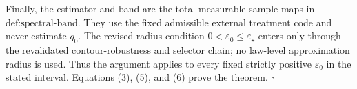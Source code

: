 Finally, the estimator and band are the total measurable sample maps in \(\text{def:spectral-band}\). They use the fixed admissible external treatment code and never estimate \(q_0\). The revised radius condition \(0<\varepsilon_0\le\varepsilon_\star\) enters only through the revalidated contour-robustness and selector chain; no law-level approximation radius is used. Thus the argument applies to every fixed strictly positive \(\varepsilon_0\) in the stated interval. Equations (3), (5), and (6) prove the theorem. \(\square\)